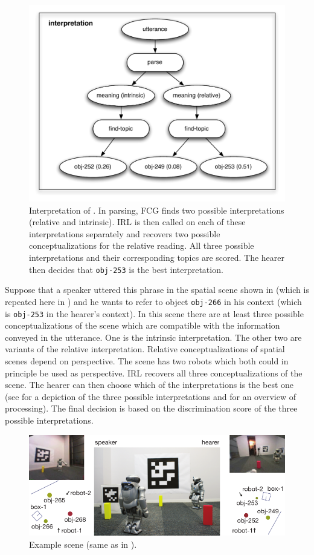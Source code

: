 \begin{figure}
	\begin{center}
		\includegraphics[width=0.5\columnwidth]{figs/semantic-ambiguity-interpretation}
	\end{center}
	\caption[Interpretation example schematic]{%
		Interpretation of . In parsing,
		FCG finds two possible interpretations (relative and intrinsic). IRL is then called 
		on each of these interpretations separately and recovers 
		two possible conceptualizations for the relative reading. All three
		possible interpretations and their corresponding topics are scored. 
		The hearer then decides that {\footnotesize\tt obj-253} is the best interpretation.}
	\label{f:processing-interpretations}
\end{figure}

Suppose that a speaker uttered this phrase in the spatial scene 
shown in  (which is repeated here in ) and he wants to refer to object {\footnotesize\tt obj-266} in his context (which
is {\footnotesize\tt obj-253} in the hearer's context). 
In this scene there are at least three possible conceptualizations of the
scene which are compatible with the information conveyed in the utterance. 
One is the intrinsic interpretation. The other two are variants of the relative
interpretation. Relative conceptualizations of spatial scenes depend on perspective.
The scene has two robots which both could in principle be used as perspective.
IRL recovers all three conceptualizations of the scene. The hearer can then
choose which of the interpretations is the best one (see  for a
depiction of the three possible interpretations and  for
an overview of processing). The final decision is based 
on the discrimination score of the three possible interpretations.

\begin{figure}
	\begin{center}
		\includegraphics[width=0.8\columnwidth]{figs/space-scene-2-small}
	\end{center}
	\caption[Example scene]{Example scene (same as in ).}
	\label{f:scene-repeated}
\end{figure}

